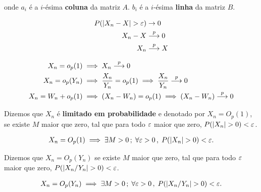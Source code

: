 \documentclass[11pt,oneside,a4paper]{article}
\numberwithin{equation}{section}
\begin{document}
\noindent
onde
$a_{i}$ é a $i$-ésima \textbf{coluna} da matriz $A$.
$b_{i}$ é a $i$-ésima \textbf{linha} da matriz $B$.

\begin{def1}
\begin{align*}
P( | X_{n} - X | > \varepsilon ) & \to 0
\\
X_{n} - X &  \overset{p}{\longrightarrow}  0
\\
X_{n} &  \overset{p}{\longrightarrow}  X
\end{align*}
\end{def1}

\begin{def1}[$o_{p}$]
\begin{align*}
X_{n} = o_{p}(1) & \implies X_{n}  \overset{p}{\longrightarrow}  0
\\
X_{n} = o_{p}(Y_{n}) & \implies
\frac{X_{n}}{Y_{n}} = o_{p}(1) \implies
\frac{X_{n}}{Y_{n}}  \overset{p}{\longrightarrow}  0
\\
X_{n} = W_{n} + o_{p}(1) & \implies
(X_{n} - W_{n}) = o_{p}(1) \implies
(X_{n} - W_{n})  \overset{p}{\longrightarrow}  0
\end{align*}
\end{def1}

\begin{def1}
Dizemos que $X_{n}$ é \textbf{limitado em probabilidade} e denotado por 
$X_{n} = O_{p}(1)$,
se existe $M$ maior que zero, tal que para todo $\varepsilon$ maior que zero, $P( | X_{n} | > 0) < \varepsilon$.

\vspace{-1 em}
\begin{align*}
X_{n} = O_{p}(1) \implies \exists M > 0 \, ; \;
\forall \varepsilon > 0 \, , \;
P( | X_{n} | > 0) < \varepsilon.
\end{align*}
\end{def1}

\begin{def1}
Dizemos que
$X_{n} = O_{p}(Y_{n})$ se existe $M$ maior que zero, tal que para todo $\varepsilon$ maior que zero, $P( | X_{n}/Y_{n} | > 0) < \varepsilon$.

\vspace{-1 em}
\begin{align*}
X_{n} = O_{p}(Y_{n}) \implies \exists M > 0 \, ; \;
\forall \varepsilon > 0 \, , \;
P( | X_{n}/Y_{n} | > 0) < \varepsilon.
\end{align*}
\end{def1}
\end{document}
